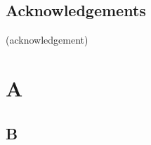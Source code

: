 \documentclass[12pt]{report}
\theoremstyle{definition}
\begin{document}
\newpage




\section*{Acknowledgements}

(acknowledgement)








\tableofcontents






\chapter{A}





\section{B}


















\newpage
{}


\end{document}
